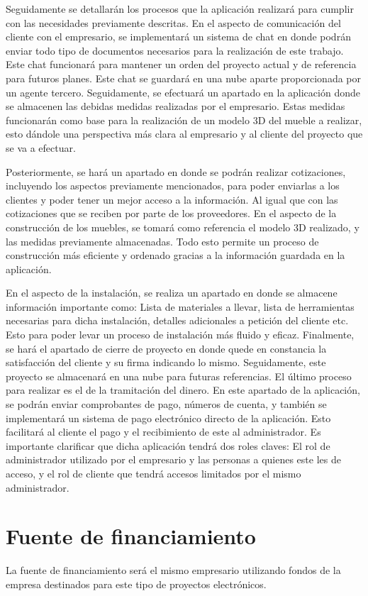 \documentclass[conference]{IEEEtran}
\begin{document}
Seguidamente se detallarán los procesos que la aplicación realizará para cumplir con las necesidades previamente descritas. En el aspecto de comunicación del cliente con el empresario, se implementará un sistema de chat en donde podrán enviar todo tipo de documentos necesarios para la realización de este trabajo. Este chat funcionará para mantener un orden del proyecto actual y de referencia para futuros planes. Este chat se guardará en una nube aparte proporcionada por un agente tercero. Seguidamente, se efectuará un apartado en la aplicación donde se almacenen las debidas medidas realizadas por el empresario. Estas medidas funcionarán como base para la realización de un modelo 3D del mueble a realizar, esto dándole una perspectiva más clara al empresario y al cliente del proyecto que se va a efectuar.

Posteriormente, se hará un apartado en donde se podrán realizar cotizaciones, incluyendo los aspectos previamente mencionados, para poder enviarlas a los clientes y poder tener un mejor acceso a la información. Al igual que con las cotizaciones que se reciben por parte de los proveedores. En el aspecto de la construcción de los muebles, se tomará como referencia el modelo 3D realizado, y las medidas previamente almacenadas. Todo esto permite un proceso de construcción más eficiente y ordenado gracias a la información guardada en la aplicación.

En el aspecto de la instalación, se realiza un apartado en donde se almacene información importante como: Lista de materiales a llevar, lista de herramientas necesarias para dicha instalación, detalles adicionales a petición del cliente etc. Esto para poder levar un proceso de instalación más fluido y eficaz. Finalmente, se hará el apartado de cierre de proyecto en donde quede en constancia la satisfacción del cliente y su firma indicando lo mismo. Seguidamente, este proyecto se almacenará en una nube para futuras referencias. El último proceso para realizar es el de la tramitación del dinero. En este apartado de la aplicación, se podrán enviar comprobantes de pago, números de cuenta, y también se implementará un sistema de pago electrónico directo de la aplicación. Esto facilitará al cliente el pago y el recibimiento de este al administrador. Es importante clarificar que dicha aplicación tendrá dos roles claves: El rol de administrador utilizado por el empresario y las personas a quienes este les de acceso, y el rol de cliente que tendrá accesos limitados por el mismo administrador.

\section{Fuente de financiamiento}
La fuente de financiamiento será el mismo empresario utilizando fondos de la empresa destinados para este tipo de proyectos electrónicos.
\end{document}
